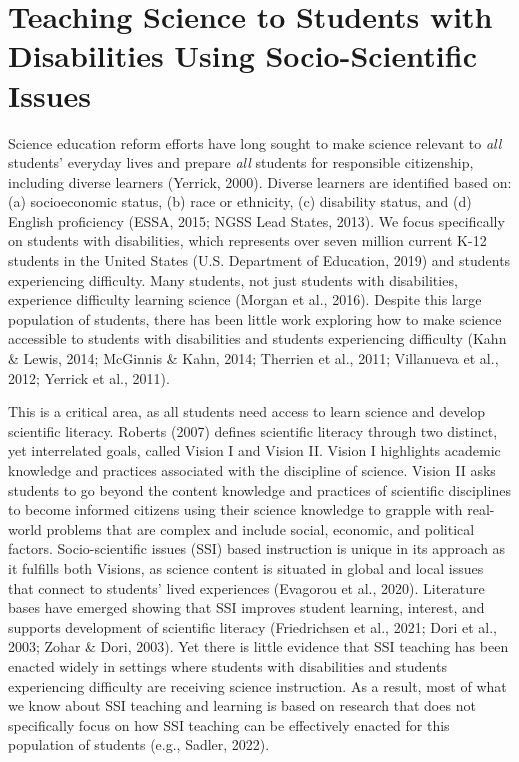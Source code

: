 \documentclass[11.5pt]{sig-alternate}
\begin{document}
\section*{Teaching Science to Students with Disabilities Using Socio-Scientific Issues}
\begin{large}
Science education reform efforts have long sought to make science relevant to \textit{all} students’ everyday lives and prepare \textit{all} students for responsible citizenship, including diverse learners (Yerrick, 2000). Diverse learners are identified based on: (a) socioeconomic status, (b) race or ethnicity, (c) disability status, and (d) English proficiency (ESSA, 2015; NGSS Lead States, 2013). We focus specifically on students with disabilities, which represents over seven million current K-12 students in the United States (U.S. Department of Education, 2019) and students experiencing difficulty. Many students, not just students with disabilities, experience difficulty learning science (Morgan et al., 2016). Despite this large population of students, there has been little work exploring how to make science accessible to students with disabilities and students experiencing difficulty (Kahn \& Lewis, 2014; McGinnis \& Kahn, 2014; Therrien et al., 2011; Villanueva et al., 2012; Yerrick et al., 2011).

This is a critical area, as all students need access to learn science and develop scientific literacy. Roberts (2007) defines scientific literacy through two distinct, yet interrelated goals, called Vision I and Vision II. Vision I highlights academic knowledge and practices associated with the discipline of science. Vision II asks students to go beyond the content knowledge and practices of scientific disciplines to become informed citizens using their science knowledge to grapple with real-world problems that are complex and include social, economic, and political factors. Socio-scientific issues (SSI) based instruction is unique in its approach as it fulfills both Visions, as science content is situated in global and local issues that connect to students’ lived experiences (Evagorou et al., 2020). Literature bases have emerged showing that SSI improves student learning, interest, and supports development of scientific literacy (Friedrichsen et al., 2021; Dori et al., 2003; Zohar \& Dori, 2003). Yet there is little evidence that SSI teaching has been enacted widely in settings where students with disabilities and students experiencing difficulty are receiving science instruction. As a result, most of what we know about SSI teaching and learning is based on research that does not specifically focus on how SSI teaching can be effectively enacted for this population of students (e.g., Sadler, 2022).


\end{large}
\end{document}
